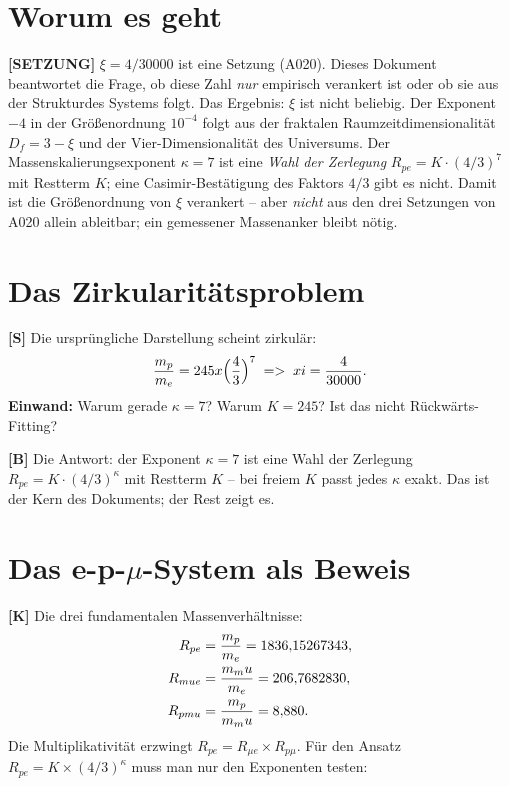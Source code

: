 \section{Worum es geht}

\textbf{[SETZUNG]} $\xi = 4/30000$ ist eine Setzung (A020). Dieses Dokument
beantwortet die Frage, ob diese Zahl \emph{nur} empirisch verankert ist oder ob
sie aus der Strukturdes Systems folgt. Das Ergebnis: $\xi$ ist nicht beliebig.
Der Exponent $-4$ in der Größenordnung $10^{-4}$ folgt aus der fraktalen
Raumzeitdimensionalität $D_f=3-\xi$ und der Vier-Dimensionalität des Universums.
Der Massenskalierungsexponent $\kappa=7$ ist eine \emph{Wahl der Zerlegung}
$R_{pe} = K\cdot(4/3)^7$ mit Restterm $K$; eine Casimir-Bestätigung des Faktors $4/3$
gibt es nicht.
Damit ist die Größenordnung von $\xi$ verankert
-- aber \emph{nicht} aus den drei Setzungen von A020 allein ableitbar; ein
gemessener Massenanker bleibt nötig.

\section{Das Zirkularitätsproblem}

\textbf{[S]} Die ursprüngliche Darstellung scheint zirkulär:
\[
  \frac{m_p}{m_e} = 245\times\Bigl(\frac43\Bigr)^7
  \;\Rightarrow\; \xi = \frac{4}{30000}.
\]
\textbf{Einwand:} Warum gerade $\kappa=7$? Warum $K=245$? Ist das nicht
Rückwärts-Fitting?

\textbf{[B]} Die Antwort: der Exponent $\kappa=7$ ist eine Wahl der Zerlegung
$R_{pe} = K\cdot(4/3)^\kappa$ mit Restterm $K$ -- bei freiem $K$ passt jedes $\kappa$ exakt.
Das ist der Kern des Dokuments; der Rest zeigt es.

\section{Das e-p-$\mu$-System als Beweis}

\textbf{[K]} Die drei fundamentalen Massenverhältnisse:
\begin{align}
  R_{pe}    &= \frac{m_p}{m_e}   = 1836{,}15267343, \notag\\
  R_{\mu e} &= \frac{m_\mu}{m_e} = 206{,}7682830, \notag\\
  R_{p\mu}  &= \frac{m_p}{m_\mu} = 8{,}880. \notag
\end{align}
Die Multiplikativität erzwingt $R_{pe} = R_{\mu e}\times R_{p\mu}$. Für den
Ansatz $R_{pe} = K\times(4/3)^\kappa$ muss man nur den Exponenten testen:

